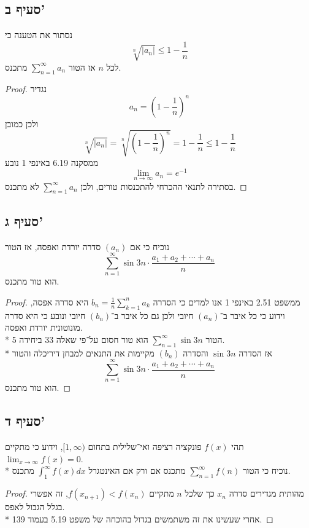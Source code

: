 \subsection{סעיף ב'}
נסתור את הטענה כי
\[
	\sqrt[n]{\lvert a_n \rvert} \le 1 - \frac{1}{n}
\]
לכל $n$ אז הטור $\sum_{n = 1}^{\infty} a_n$ מתכנס.
\begin{proof}
	נגדיר
	\[
		a_n = {(1 - \frac{1}{n})}^n
	\]
	ולכן כמובן
	\[
		\sqrt[n]{\lvert a_n \rvert}
		= \sqrt[n]{{(1 - \frac{1}{n})}^n}
		= 1 - \frac{1}{n}
		\le 1 - \frac{1}{n}
	\]
	ממסקנה 6.19 באינפי 1 נובע
	\[
		\lim_{n \to \infty} a_n = e^{-1}
	\]
	בסתירה לתנאי ההכרחי להתכנסות טורים, ולכן $\sum_{n = 1}^{\infty} a_n$ לא מתכנס.
\end{proof}

\subsection{סעיף ג'}
נוכיח כי אם $(a_n)$ סדרה יורדת ואפסה,
אז הטור
\[
	\sum_{n = 1}^{\infty} \sin 3n \cdot \frac{a_1 + a_2 + \cdots + a_n}{n}
\]
הוא טור מתכנס.
\begin{proof}
	ממשפט 2.51 באינפי 1 אנו למדים כי הסדרה $b_n = \frac{1}{n} \sum_{k = 1}^{n} a_k$ היא סדרה אפסה,
	וידוע כי כל איבר ב־$(a_n)$ חיובי ולכן גם כל איבר ב־$(b_n)$ חיובי ונובע כי היא סדרה מונוטונית יורדת ואפסה. \\*
	הטור $\sum_{n = 1}^{\infty} \sin 3n$ הוא טור חסום על־פי שאלה 33 ביחידה 5. \\*
	אז הסדרה $\sin 3n$ והסדרה $(b_n)$ מקיימות את התנאים למבחן דיריכלה והטור
	\[
		\sum_{n = 1}^{\infty} \sin 3n \cdot \frac{a_1 + a_2 + \cdots + a_n}{n}
	\]
	הוא טור מתכנס.
\end{proof}

\subsection{סעיף ד'}
תהי $f(x)$ פונקציה רציפה ואי־שלילית בתחום $[1, \infty)$, וידוע כי מתקיים $\lim_{x \to \infty} f(x) = 0$. \\* %
נוכיח כי הטור $\sum_{n = 1}^{\infty} f(n)$ מתכנס אם ורק אם האינטגרל $\int_{1}^{\infty} f(x) dx$ מתכנס.
\begin{proof}
	מהותית מגדירים סדרה $x_n$ כך שלכל $n$ מתקיים $f(x_{n + 1}) < f(x_n)$, זה אפשרי בגלל הגבול לאפס. \\*
	אחרי שעשינו את זה משתמשים בגדול בהוכחה של משפט 5.19 בעמוד 139.
\end{proof}

